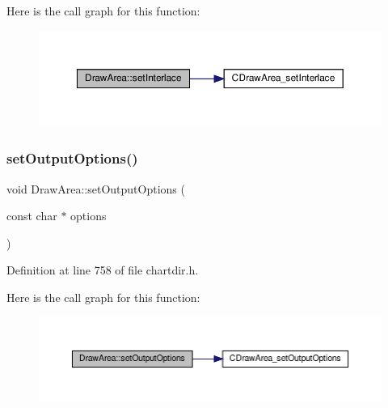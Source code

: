 Here is the call graph for this function\+:
\nopagebreak
\begin{figure}[H]
\begin{center}
\leavevmode
\includegraphics[width=350pt]{class_draw_area_a06bf510fdff11b5e46a3c3827713b4c1_cgraph}
\end{center}
\end{figure}
\mbox{\label{class_draw_area_af0ad88033f768884f60653686f782666}} 
\subsubsection{\texorpdfstring{set\+Output\+Options()}{setOutputOptions()}}
{\footnotesize\ttfamily void Draw\+Area\+::set\+Output\+Options (\begin{DoxyParamCaption}\item[{const char $\ast$}]{options }\end{DoxyParamCaption})\hspace{0.3cm}{\ttfamily [inline]}}



Definition at line 758 of file chartdir.\+h.

Here is the call graph for this function\+:
\nopagebreak
\begin{figure}[H]
\begin{center}
\leavevmode
\includegraphics[width=350pt]{class_draw_area_af0ad88033f768884f60653686f782666_cgraph}
\end{center}
\end{figure}
\mbox{\label{class_draw_area_a967013dbd39a05ea06ae46ef3957fb46}} 
